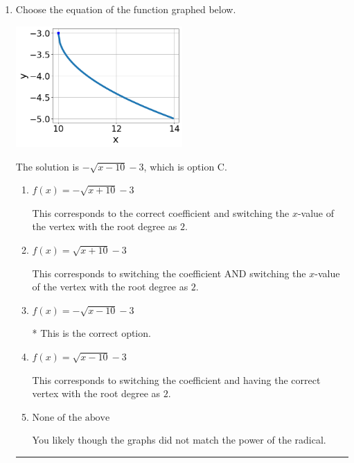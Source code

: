 \documentclass{extbook}[14pt]
\newcommand{\litem}[1]{\item #1

\rule{\textwidth}{0.4pt}}
\begin{document}
\begin{enumerate}\litem{
Choose the equation of the function graphed below.

\begin{center}
    \includegraphics[width=0.5\textwidth]{../Figures/radicalGraphToEquationA.png}
\end{center}


The solution is \( - \sqrt{x - 10} - 3 \), which is option C.\begin{enumerate}[label=\Alph*.]
\item \( f(x) = - \sqrt{x + 10} - 3 \)

This corresponds to the correct coefficient and switching the $x$-value of the vertex with the root degree as $2$.
\item \( f(x) = \sqrt{x + 10} - 3 \)

This corresponds to switching the coefficient AND switching the $x$-value of the vertex with the root degree as $2$.
\item \( f(x) = - \sqrt{x - 10} - 3 \)

* This is the correct option.
\item \( f(x) = \sqrt{x - 10} - 3 \)

This corresponds to switching the coefficient and having the correct vertex with the root degree as $2$.
\item \( \text{None of the above} \)

You likely though the graphs did not match the power of the radical.
\end{enumerate}

}
\end{enumerate}
\end{document}
